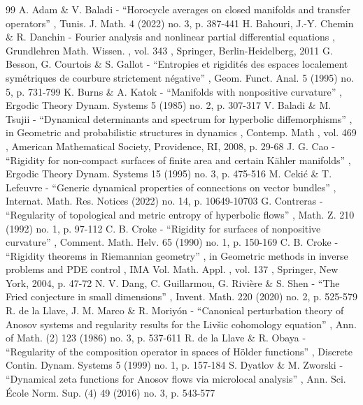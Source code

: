 \documentclass[10pt]{amsart}
\theoremstyle{plain}
\theoremstyle{definition}
\begin{document}
\begin{thebibliography}{99}
 A. Adam \& V. Baladi - “Horocycle averages on closed manifolds and transfer operators” , Tunis. J. Math. 4 (2022) no. 3, p. 387-441
 H. Bahouri, J.-Y. Chemin \& R. Danchin - Fourier analysis and nonlinear partial differential equations , Grundlehren Math. Wissen. , vol. 343 , Springer, Berlin-Heidelberg, 2011
 G. Besson, G. Courtois \& S. Gallot - “Entropies et rigidités des espaces localement symétriques de courbure strictement négative” , Geom. Funct. Anal. 5 (1995) no. 5, p. 731-799
 K. Burns \& A. Katok - “Manifolds with nonpositive curvature” , Ergodic Theory Dynam. Systems 5 (1985) no. 2, p. 307-317
 V. Baladi \& M. Tsujii - “Dynamical determinants and spectrum for hyperbolic diffemorphisms” , in Geometric and probabilistic structures in dynamics , Contemp. Math , vol. 469 , American Mathematical Society, Providence, RI, 2008, p. 29-68
 J. G. Cao - “Rigidity for non-compact surfaces of finite area and certain Kähler manifolds” , Ergodic Theory Dynam. Systems 15 (1995) no. 3, p. 475-516
 M. Cekić \& T. Lefeuvre - “Generic dynamical properties of connections on vector bundles” , Internat. Math. Res. Notices (2022) no. 14, p. 10649-10703
 G. Contreras - “Regularity of topological and metric entropy of hyperbolic flows” , Math. Z. 210 (1992) no. 1, p. 97-112
 C. B. Croke - “Rigidity for surfaces of nonpositive curvature” , Comment. Math. Helv. 65 (1990) no. 1, p. 150-169
 C. B. Croke - “Rigidity theorems in Riemannian geometry” , in Geometric methods in inverse problems and PDE control , IMA Vol. Math. Appl. , vol. 137 , Springer, New York, 2004, p. 47-72
 N. V. Dang, C. Guillarmou, G. Rivière \& S. Shen - “The Fried conjecture in small dimensions” , Invent. Math. 220 (2020) no. 2, p. 525-579
 R. de la Llave, J. M. Marco \& R. Moriyón - “Canonical perturbation theory of Anosov systems and regularity results for the Livšic cohomology equation” , Ann. of Math. (2) 123 (1986) no. 3, p. 537-611
 R. de la Llave \& R. Obaya - “Regularity of the composition operator in spaces of Hölder functions” , Discrete Contin. Dynam. Systems 5 (1999) no. 1, p. 157-184
 S. Dyatlov \& M. Zworski - “Dynamical zeta functions for Anosov flows via microlocal analysis” , Ann. Sci. École Norm. Sup. (4) 49 (2016) no. 3, p. 543-577

\end{thebibliography}
\end{document}
